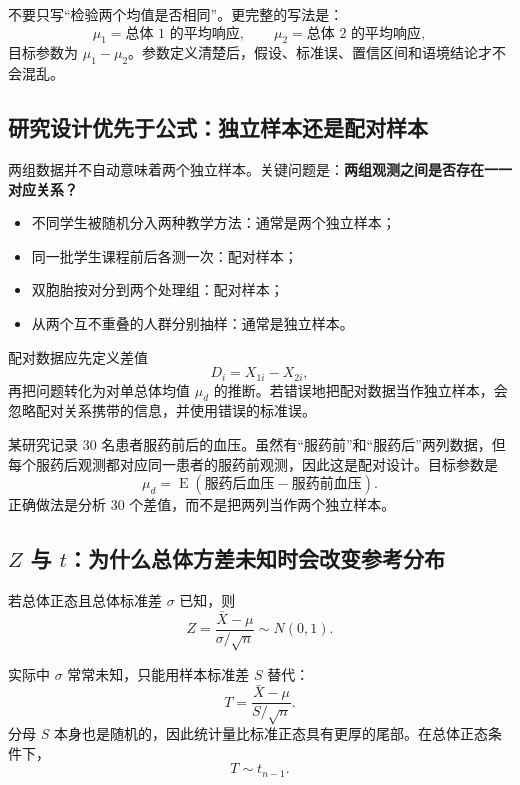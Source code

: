 \documentclass[11pt,a4paper]{article}
\newcommand{\E}{\operatorname{E}}
\begin{document}
\begin{methodbox}[定义参数的标准写法]
不要只写“检验两个均值是否相同”。更完整的写法是：
\[
  \mu_1=\text{总体 1 的平均响应},
  \qquad
  \mu_2=\text{总体 2 的平均响应},
\]
目标参数为 $\mu_1-\mu_2$。参数定义清楚后，假设、标准误、置信区间和语境结论才不会混乱。
\end{methodbox}

\subsection{研究设计优先于公式：独立样本还是配对样本}

两组数据并不自动意味着两个独立样本。关键问题是：\textbf{两组观测之间是否存在一一对应关系？}

\begin{itemize}
  \item 不同学生被随机分入两种教学方法：通常是两个独立样本；
  \item 同一批学生课程前后各测一次：配对样本；
  \item 双胞胎按对分到两个处理组：配对样本；
  \item 从两个互不重叠的人群分别抽样：通常是独立样本。
\end{itemize}

配对数据应先定义差值
\[
  D_i=X_{1i}-X_{2i},
\]
再把问题转化为对单总体均值 $\mu_d$ 的推断。若错误地把配对数据当作独立样本，会忽略配对关系携带的信息，并使用错误的标准误。

\begin{examplebox}[设计判断]
某研究记录 30 名患者服药前后的血压。虽然有“服药前”和“服药后”两列数据，但每个服药后观测都对应同一患者的服药前观测，因此这是配对设计。目标参数是
\[
  \mu_d=\E(\text{服药后血压}-\text{服药前血压}).
\]
正确做法是分析 30 个差值，而不是把两列当作两个独立样本。
\end{examplebox}

\subsection{\texorpdfstring{$Z$ 与 $t$：为什么总体方差未知时会改变参考分布}{Z 与 t：为什么总体方差未知时会改变参考分布}}

若总体正态且总体标准差 $\sigma$ 已知，则
\[
  Z
  =
  \frac{\bar X-\mu}{\sigma/\sqrt n}
  \sim N(0,1).
\]

实际中 $\sigma$ 常常未知，只能用样本标准差 $S$ 替代：
\[
  T
  =
  \frac{\bar X-\mu}{S/\sqrt n}.
\]
分母 $S$ 本身也是随机的，因此统计量比标准正态具有更厚的尾部。在总体正态条件下，
\[
  \boxed{
  T\sim t_{n-1}.
  }
\]
\end{document}
